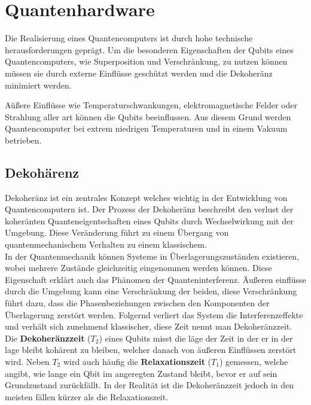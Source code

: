 \section{Quantenhardware}
\label{sec:quantenhardware}

Die Realisierung eines Quantencomputers ist durch hohe technische herausforderungen geprägt. Um die besonderen Eigenschaften der Qubits eines Quantencomputers, wie Superposition und Verschränkung, zu nutzen können müssen sie durch externe Einflüsse geschützt werden und die Dekoheränz minimiert werden.

Aüßere Einflüsse wie Temperaturschwankungen, elektromagnetische Felder oder Strahlung aller art können die Qubits beeinflussen. Aus diesem Grund werden Quantencomputer bei extrem niedrigen Temperaturen und in einem Vakuum betrieben.

\subsection{Dekohärenz}
\label{sub:dekohaerenz}
Dekoheränz ist ein zentrales Konzept welches wichtig in der Entwicklung von Quantencomputern ist. Der Prozess der Dekoheränz beschreibt den verlust der koheränten Quanteneigentschaften eines Qubits durch Wechselwirkung mit der Umgebung.
Diese Veränderung führt zu einem Übergang von quantenmechanischem Verhalten zu einem klassischem.\\

In der Quantenmechanik können Systeme in Überlagerungszuständen existieren, wobei mehrere Zustände gleichzeitig eingenommen werden können. Diese Eigenschaft erklärt auch das Phänomen der Quanteninterferenz.
Äußeren einflüsse durch die Umgebung kann eine Verschränkung der beiden, diese Verschränkung führt dazu, dass die Phasenbeziehungen zwischen den Komponenten der Überlagerung zerstört werden.
Folgernd verliert das System die Interferenzeffekte und verhält sich zunehmend klassischer, diese Zeit nennt man Dekoheränzzeit.\\

Die \textbf{Dekoheränzzeit} ($T_2$) eines Qubits misst die läge der Zeit in der er in der lage bleibt kohärent zu bleiben, welcher danach von äußeren Einflüssen zerstört wird.
Neben $T_2$ wird auch häufig die \textbf{Relaxationszeit} ($T_1$) gemessen, welche angibt, wie lange ein Qbit im angeregten Zustand bleibt, bevor er auf sein Grundzustand zurückfällt.
In der Realität ist die Dekoheränzzeit jedoch in den meisten fällen kürzer als die Relaxationszeit.\\

